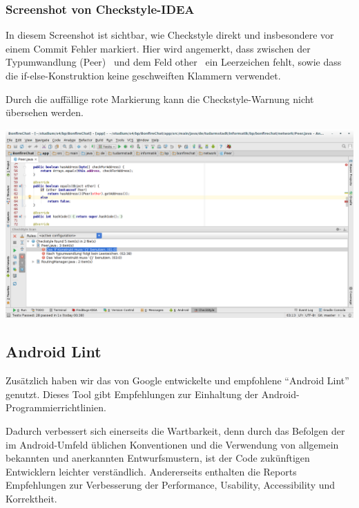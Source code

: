 


\subsubsection{Screenshot von Checkstyle-IDEA}

In diesem Screenshot ist sichtbar, wie Checkstyle direkt und insbesondere vor einem Commit Fehler markiert. Hier wird angemerkt, dass zwischen der Typumwandlung \glqq (Peer)\grqq~ und dem Feld \glqq other\grqq~ ein Leerzeichen fehlt, sowie dass die if-else-Konstruktion keine geschweiften Klammern verwendet.

Durch die auffällige rote Markierung kann die Checkstyle-Warnung nicht übersehen werden.

\includegraphics[width=17.5cm]{belege/checkstyle/checkstyle-idea-screenshot.png}


\clearpage
\subsection{Android Lint}

Zusätzlich haben wir das von Google entwickelte und empfohlene ``Android Lint''
genutzt. Dieses Tool gibt Empfehlungen zur Einhaltung der Android-Programmierrichtlinien.

Dadurch verbessert sich einerseits die Wartbarkeit, denn durch das Befolgen der im Android-Umfeld üblichen
 Konventionen und die Verwendung von allgemein bekannten und anerkannten Entwurfsmustern, ist der Code zukünftigen
Entwicklern leichter verständlich.
Andererseits enthalten die Reports Empfehlungen zur Verbesserung der Performance, Usability, Accessibility und Korrektheit.

